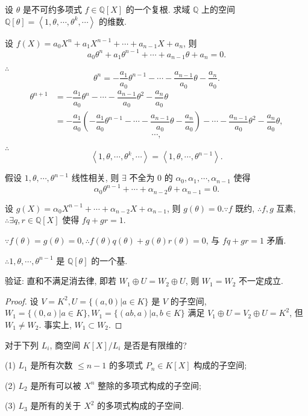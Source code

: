 \documentclass{ctexart}
\begin{document}
\begin{exercise}%
    设 $\theta$ 是不可约多项式 $f\in\mathbb{Q}[X]$ 的一个复根. 求域 $\mathbb{Q}$ 上的空间 $\mathbb{Q}[\theta]=\left<1,\theta,\cdots,\theta^k,\cdots\right>$ 的维数.
\end{exercise}
\begin{solution}
    设 $f(X)=a_0X^n+a_1X^{n-1}+\cdots+a_{n-1}X+a_n$, 则
    \[a_0\theta^n+a_1\theta^{n-1}+\cdots+a_{n-1}\theta+a_n=0.\]
    
    $\therefore$
    \[\theta^n=-\dfrac{a_1}{a_0}\theta^{n-1}-\cdots-\dfrac{a_{n-1}}{a_0}\theta-\dfrac{a_n}{a_0}.\]
    \begin{align*}
        \theta^{n+1} & =-\dfrac{a_1}{a_0}\theta^n-\cdots-\dfrac{a_{n-1}}{a_0}\theta^2-\dfrac{a_n}{a_0}\theta \\
        & =-\dfrac{a_1}{a_0}\left(-\dfrac{a_1}{a_0}\theta^{n-1}-\cdots-\dfrac{a_{n-1}}{a_0}\theta-\dfrac{a_n}{a_0}\right)-\cdots-\dfrac{a_{n-1}}{a_0}\theta^2-\dfrac{a_n}{a_0}\theta,
    \end{align*}
    \[\cdots,\]

    $\therefore$
    \[\left<1,\theta,\cdots,\theta^k,\cdots\right>=\left<1,\theta,\cdots,\theta^{n-1}\right>.\]

    假设 $1,\theta,\cdots,\theta^{n-1}$ 线性相关, 则 $\exists$ 不全为 $0$ 的 $\alpha_0,\alpha_1,\cdots,\alpha_{n-1}$ 使得
    \[\alpha_0\theta^{n-1}+\cdots+\alpha_{n-2}\theta+\alpha_{n-1}=0.\]

    设 $g(X)=\alpha_0X^{n-1}+\cdots+\alpha_{n-2}X+\alpha_{n-1}$, 则 $g(\theta)=0.\because f$ 既约, $\therefore f,g$ 互素, $\therefore\exists q,r\in\mathbb{Q}[X]$ 使得 $fq+gr=1$.

    $\because f(\theta)=g(\theta)=0,\therefore f(\theta)q(\theta)+g(\theta)r(\theta)=0$, 与 $fq+gr=1$ 矛盾.

    $\therefore1,\theta,\cdots,\theta^{n-1}$ 是 $\mathbb{Q}[\theta]$ 的一个基.
\end{solution}
\begin{exercise}%
    验证: 直和不满足消去律, 即若 $W_1\oplus U=W_2\oplus U$, 则 $W_1=W_2$ 不一定成立.
\end{exercise}
\begin{proof}
    设 $V=K^2,U=\{(a,0)|a\in K\}$ 是 $V$ 的子空间, $W_1=\{(0,a)|a\in K\},W_1=\{(ab,a)|a,b\in K\}$ 满足 $V_1\oplus U=V_2\oplus U=K^2$, 但 $W_1\neq W_2$. 事实上, $W_1\subset W_2$.
\end{proof}
\begin{exercise}%
    对于下列 $L_i$, 商空间 $K[X]/L_i$ 是否是有限维的?

    (1) $L_1$ 是所有次数 $\leq n-1$ 的多项式 $P_n\in K[X]$ 构成的子空间;

    (2) $L_2$ 是所有可以被 $X^n$ 整除的多项式构成的子空间;

    (3) $L_3$ 是所有的关于 $X^2$ 的多项式构成的子空间.
\end{exercise}
\end{document}
